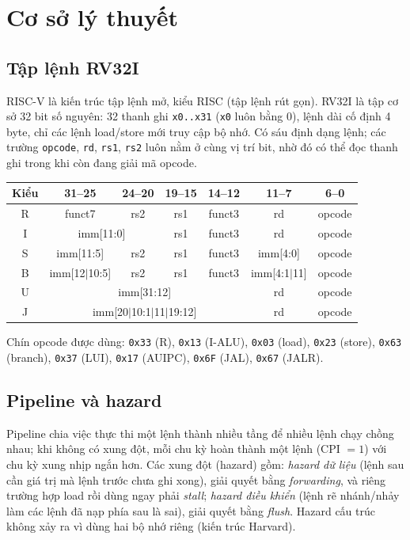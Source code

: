 \documentclass[11pt,a4paper]{article}
\begin{document}
\section{Cơ sở lý thuyết}
\subsection{Tập lệnh RV32I}
RISC-V là kiến trúc tập lệnh mở, kiểu RISC (tập lệnh rút gọn). RV32I là tập cơ sở 32 bit số nguyên: 32 thanh ghi \texttt{x0..x31} (\texttt{x0} luôn bằng 0), lệnh dài cố định 4 byte,
chỉ các lệnh load/store mới truy cập bộ nhớ. Có sáu định dạng lệnh; các trường \texttt{opcode}, \texttt{rd}, \texttt{rs1}, \texttt{rs2} luôn nằm ở cùng vị trí bit, nhờ đó
có thể đọc thanh ghi trong khi còn đang giải mã opcode.

\begin{center}
\small
\setlength{\tabcolsep}{3pt}
\begin{tabular}{|c|c|c|c|c|c|c|}
\hline
\textbf{Kiểu} & \textbf{31--25} & \textbf{24--20} & \textbf{19--15} & \textbf{14--12} & \textbf{11--7} & \textbf{6--0}\\
\hline
R & funct7 & rs2 & rs1 & funct3 & rd & opcode\\
\hline
I & \multicolumn{2}{c|}{imm[11:0]} & rs1 & funct3 & rd & opcode\\
\hline
S & imm[11:5] & rs2 & rs1 & funct3 & imm[4:0] & opcode\\
\hline
B & imm[12$|$10:5] & rs2 & rs1 & funct3 & imm[4:1$|$11] & opcode\\
\hline
U & \multicolumn{4}{c|}{imm[31:12]} & rd & opcode\\
\hline
J & \multicolumn{4}{c|}{imm[20$|$10:1$|$11$|$19:12]} & rd & opcode\\
\hline
\end{tabular}
\end{center}

Chín opcode được dùng: \texttt{0x33} (R), \texttt{0x13} (I-ALU), \texttt{0x03} (load), \texttt{0x23} (store), \texttt{0x63} (branch), \texttt{0x37} (LUI),
\texttt{0x17} (AUIPC), \texttt{0x6F} (JAL), \texttt{0x67} (JALR).

\subsection{Pipeline và hazard}
Pipeline chia việc thực thi một lệnh thành nhiều tầng để nhiều lệnh chạy chồng nhau; khi không có xung đột, mỗi chu kỳ hoàn thành một lệnh (CPI $=1$) với chu kỳ xung nhịp ngắn hơn.
Các xung đột (hazard) gồm: \emph{hazard dữ liệu} (lệnh sau cần giá trị mà lệnh trước chưa ghi xong), giải quyết bằng \emph{forwarding}, và riêng trường hợp load rồi dùng ngay phải \emph{stall};
\emph{hazard điều khiển} (lệnh rẽ nhánh/nhảy làm các lệnh đã nạp phía sau là sai), giải quyết bằng \emph{flush}. Hazard cấu trúc không xảy ra vì dùng hai bộ nhớ riêng (kiến trúc Harvard).
\end{document}
